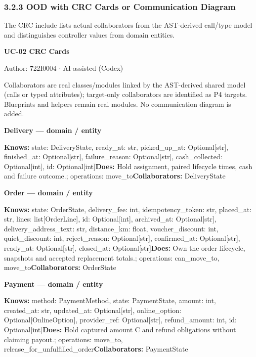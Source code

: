 \subsubsection*{3.2.3 OOD with CRC Cards or Communication Diagram}
\label{CRC-UC-02}
The CRC include lists actual collaborators from the AST-derived call/type model and distinguishes controller values from domain entities.

\textbf{UC-02 CRC Cards}

Author: 722I0004 \ensuremath{\cdot} AI-assisted (Codex)

Collaborators are real classes/modules linked by the AST-derived shared model (calls or typed attributes); target-only collaborators are identified as P4 targets. Blueprints and helpers remain real modules. No communication diagram is added.

\textbf{Delivery --- domain / \guillemotleft{}entity\guillemotright{}}

\textbf{Knows:} state: DeliveryState, ready\_at: str, picked\_up\_at: Optional[str], finished\_at: Optional[str], failure\_reason: Optional[str], cash\_collected: Optional[int], id: Optional[int]\newline{}\textbf{Does:} Hold assignment, paired lifecycle times, cash and failure outcome.; operations: move\_to\newline{}\textbf{Collaborators:} DeliveryState

\textbf{Order --- domain / \guillemotleft{}entity\guillemotright{}}

\textbf{Knows:} state: OrderState, delivery\_fee: int, idempotency\_token: str, placed\_at: str, lines: list[OrderLine], id: Optional[int], archived\_at: Optional[str], delivery\_address\_text: str, distance\_km: float, voucher\_discount: int, quiet\_discount: int, reject\_reason: Optional[str], confirmed\_at: Optional[str], ready\_at: Optional[str], closed\_at: Optional[str]\newline{}\textbf{Does:} Own the order lifecycle, snapshots and accepted replacement totals.; operations: can\_move\_to, move\_to\newline{}\textbf{Collaborators:} OrderState

\textbf{Payment --- domain / \guillemotleft{}entity\guillemotright{}}

\textbf{Knows:} method: PaymentMethod, state: PaymentState, amount: int, created\_at: str, updated\_at: Optional[str], online\_option: Optional[OnlineOption], provider\_ref: Optional[str], refund\_amount: int, id: Optional[int]\newline{}\textbf{Does:} Hold captured amount C and refund obligations without claiming payout.; operations: move\_to, release\_for\_unfulfilled\_order\newline{}\textbf{Collaborators:} PaymentState

